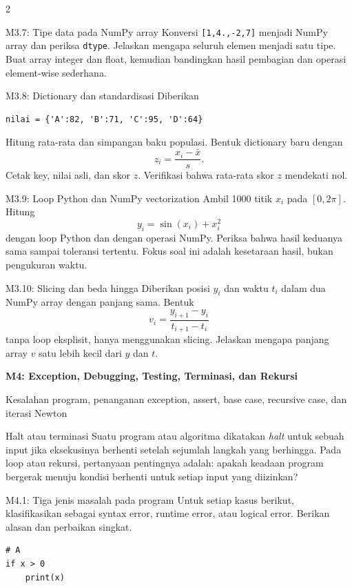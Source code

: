\documentclass[9pt,a4paper]{article}
\newcommand{\bab}[2]{%
  \vspace{2pt}
  {\color{iteraBlue}\Large\bfseries #1}\par
  {\color{darkgray}\small #2}\par\vspace{3pt}
}
\begin{document}
\begin{multicols}{2}
\begin{qbox}[L2]{M3.7: Tipe data pada NumPy array}
Konversi \texttt{[1,4.,-2,7]} menjadi NumPy array dan periksa \texttt{dtype}. Jelaskan mengapa seluruh elemen menjadi satu tipe. Buat array integer dan float, kemudian bandingkan hasil pembagian dan operasi element-wise sederhana.
\end{qbox}

\begin{qbox}[L3]{M3.8: Dictionary dan standardisasi}
Diberikan
\begin{lstlisting}
nilai = {'A':82, 'B':71, 'C':95, 'D':64}
\end{lstlisting}
Hitung rata-rata dan simpangan baku populasi. Bentuk dictionary baru dengan
\[
z_i=\frac{x_i-\bar x}{s}.
\]
Cetak key, nilai asli, dan skor $z$. Verifikasi bahwa rata-rata skor $z$ mendekati nol.
\end{qbox}

\begin{qbox}[L3]{M3.9: Loop Python dan NumPy vectorization}
Ambil 1000 titik $x_i$ pada $[0,2\pi]$. Hitung
\[
y_i=\sin(x_i)+x_i^2
\]
dengan loop Python dan dengan operasi NumPy. Periksa bahwa hasil keduanya sama sampai toleransi tertentu. Fokus soal ini adalah kesetaraan hasil, bukan pengukuran waktu.
\end{qbox}

\begin{qbox}[L4]{M3.10: Slicing dan beda hingga}
Diberikan posisi $y_i$ dan waktu $t_i$ dalam dua NumPy array dengan panjang sama. Bentuk
\[
v_i=\frac{y_{i+1}-y_i}{t_{i+1}-t_i}
\]
tanpa loop eksplisit, hanya menggunakan slicing. Jelaskan mengapa panjang array $v$ satu lebih kecil dari $y$ dan $t$.
\end{qbox}

\bab{M4: Exception, Debugging, Testing, Terminasi, dan Rekursi}{Kesalahan program, penanganan exception, assert, base case, recursive case, dan iterasi Newton}

\begin{conceptbox}{Halt atau terminasi}
Suatu program atau algoritma dikatakan \textit{halt} untuk sebuah input jika eksekusinya berhenti setelah sejumlah langkah yang berhingga. Pada loop atau rekursi, pertanyaan pentingnya adalah: apakah keadaan program bergerak menuju kondisi berhenti untuk setiap input yang diizinkan?
\end{conceptbox}

\begin{qbox}[L1]{M4.1: Tiga jenis masalah pada program}
Untuk setiap kasus berikut, klasifikasikan sebagai syntax error, runtime error, atau logical error. Berikan alasan dan perbaikan singkat.
\begin{lstlisting}
# A
if x > 0
    print(x)


\end{lstlisting}
\end{qbox}
\end{multicols}
\end{document}
